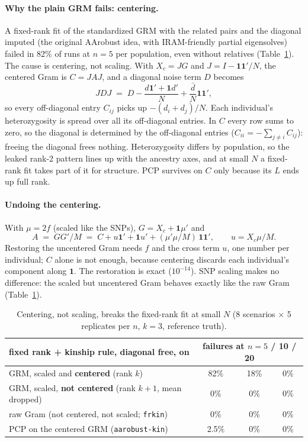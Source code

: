 \documentclass[11pt,a4paper]{article}
\begin{document}
\paragraph{Why the plain GRM fails: centering.} A fixed-rank fit of the
standardized GRM with the related pairs and the diagonal imputed (the
original AArobust idea, with IRAM-friendly partial eigensolves) failed in 82\%
of runs at $n=5$ per population, even without relatives
(Table~\ref{tab:centering}). The cause is centering, not scaling. With
$X_c=JG$ and $J=I-\mathbf{1}\mathbf{1}'/N$, the centered Gram is $C=JAJ$, and a
diagonal noise term $D$ becomes
\[
  JDJ \;=\; D-\frac{d\mathbf 1'+\mathbf 1d'}{N}+\frac{\bar d}{N}\mathbf 1\mathbf 1' ,
\]
so every off-diagonal entry $C_{ij}$ picks up $-(d_i+d_j)/N$. Each
individual's heterozygosity is spread over all its off-diagonal entries. In
$C$ every row sums to zero, so the diagonal is determined by the off-diagonal
entries ($C_{ii}=-\sum_{j\ne i}C_{ij}$): freeing the diagonal frees nothing.
Heterozygosity differs by population, so the leaked rank-2 pattern lines up
with the ancestry axes, and at small $N$ a fixed-rank fit takes part of it for
structure. PCP survives on $C$ only because its $L$ ends up full rank.

\paragraph{Undoing the centering.} With $\mu=2f$ (scaled like the SNPs),
$G=X_c+\mathbf 1\mu'$ and
\[
  A \;=\; GG'/M \;=\; C+u\mathbf 1'+\mathbf 1u'+(\mu'\mu/M)\,\mathbf 1\mathbf 1',
  \qquad u=X_c\mu/M .
\]
Restoring the uncentered Gram needs $f$ and the cross term $u$, one number per
individual; $C$ alone is not enough, because centering discards each
individual's component along $\mathbf 1$. The restoration is exact
($10^{-14}$). SNP scaling makes no difference: the scaled but uncentered Gram
behaves exactly like the raw Gram (Table~\ref{tab:centering}).

\begin{table}[htbp]
\centering\small
\begin{tabular}{@{}lccc@{}}
\toprule
fixed rank + kinship rule, diagonal free, on & \multicolumn{3}{c}{failures at $n=5$ / 10 / 20} \\
\midrule
GRM, scaled and \textbf{centered} (rank $k$) & 82\% & 18\% & 0\% \\
GRM, scaled, \textbf{not centered} (rank $k+1$, mean dropped) & 0\% & 0\% & 0\% \\
raw Gram (not centered, not scaled; \texttt{frkin}) & 0\% & 0\% & 0\% \\
PCP on the centered GRM (\texttt{aarobust-kin}) & 2.5\% & 0\% & 0\% \\
\bottomrule
\end{tabular}
\caption{Centering, not scaling, breaks the fixed-rank fit at small $N$
(8 scenarios $\times$ 5 replicates per $n$, $k=3$, reference truth).}
\label{tab:centering}
\end{table}
\end{document}
